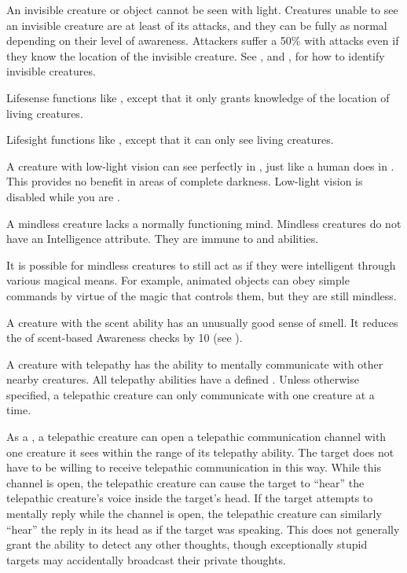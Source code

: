         An invisible creature or object cannot be seen with light.
        Creatures unable to see an invisible creature are at least \partiallyunaware of its attacks, and they can be fully \unaware as normal depending on their level of awareness.
        Attackers suffer a 50\%  with  attacks even if they know the location of the invisible creature.
        See , and , for how to identify invisible creatures.

        Lifesense functions like , except that it only grants knowledge of the location of living creatures.

        Lifesight functions like , except that it can only see living creatures.

        A creature with low-light vision can see perfectly in , just like a human does in .
        This provides no benefit in areas of complete darkness.
        Low-light vision is disabled while you are \dazzled.

        A mindless creature lacks a normally functioning mind.
        Mindless creatures do not have an Intelligence attribute.
        They are immune to  and  abilities.

        It is possible for mindless creatures to still act as if they were intelligent through various magical means.
        For example, animated objects can obey simple commands by virtue of the magic that controls them, but they are still mindless.

        A creature with the scent ability has an unusually good sense of smell.
        It reduces the  of scent-based Awareness checks by 10 (see ).

        A creature with telepathy has the ability to mentally communicate with other nearby creatures.
        All telepathy abilities have a defined .
        Unless otherwise specified, a telepathic creature can only communicate with one creature at a time.

        As a , a telepathic creature can open a telepathic communication channel with one creature it sees within the range of its telepathy ability.
        The target does not have to be willing to receive telepathic communication in this way.
        While this channel is open, the telepathic creature can cause the target to ``hear'' the telepathic creature's voice inside the target's head.
        If the target attempts to mentally reply while the channel is open, the telepathic creature can similarly ``hear'' the reply in its head as if the target was speaking.
        This does not generally grant the ability to detect any other thoughts, though exceptionally stupid targets may accidentally broadcast their private thoughts.

